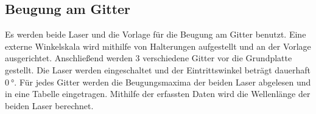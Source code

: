 \subsection{Beugung am Gitter}
\label{BeugungGitter_durch}

Es werden beide Laser und die Vorlage für die Beugung am Gitter benutzt.
Eine externe Winkelskala wird mithilfe von Halterungen aufgestellt und an der Vorlage ausgerichtet.
Anschließend werden $3$ verschiedene Gitter vor die Grundplatte gestellt. Die Laser werden eingeschaltet und der
Eintrittswinkel beträgt dauerhaft $\qty{0}{\degree}$. 
Für jedes Gitter werden die Beugungsmaxima der beiden Laser abgelesen und in eine Tabelle eingetragen.
Mithilfe der erfassten Daten wird die Wellenlänge der beiden Laser berechnet.
